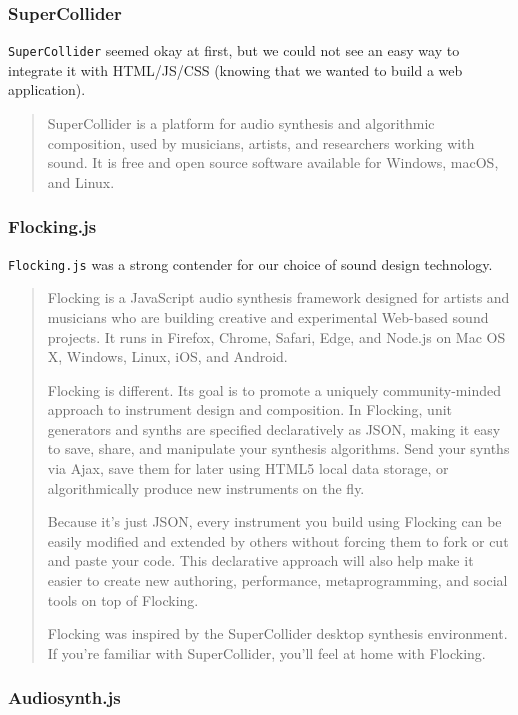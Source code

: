 \documentclass[12pt,a4paper]{article}
\newcommand{\lightcode}[1]{\colorbox{light-gray}{\texttt{#1}}}
\begin{document}
\subsubsection{SuperCollider}
\lightcode{SuperCollider} seemed okay at first, but we could not see an easy way to integrate it with HTML/JS/CSS (knowing that we wanted to build a web application).

\begin{quote}
SuperCollider is a platform for audio synthesis and algorithmic composition, used by musicians, artists, and researchers working with sound. It is free and open source software available for Windows, macOS, and Linux. \cite{supercollider}
\end{quote}

\subsubsection{Flocking.js}
\lightcode{Flocking.js} was a strong contender for our choice of sound design technology.

\begin{quote}
Flocking is a JavaScript audio synthesis framework designed for artists and musicians who are building creative and experimental Web-based sound projects. It runs in Firefox, Chrome, Safari, Edge, and Node.js on Mac OS X, Windows, Linux, iOS, and Android.

Flocking is different. Its goal is to promote a uniquely community-minded approach to instrument design and composition. In Flocking, unit generators and synths are specified declaratively as JSON, making it easy to save, share, and manipulate your synthesis algorithms. Send your synths via Ajax, save them for later using HTML5 local data storage, or algorithmically produce new instruments on the fly.

Because it's just JSON, every instrument you build using Flocking can be easily modified and extended by others without forcing them to fork or cut and paste your code. This declarative approach will also help make it easier to create new authoring, performance, metaprogramming, and social tools on top of Flocking.

Flocking was inspired by the SuperCollider desktop synthesis environment. If you're familiar with SuperCollider, you'll feel at home with Flocking. \cite{flocking}
\end{quote}

\subsubsection{Audiosynth.js}
\end{document}
